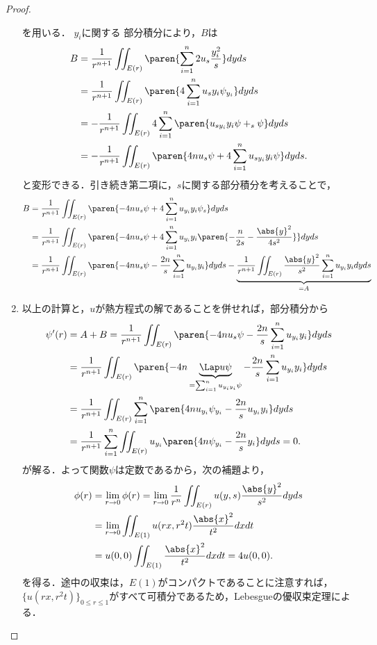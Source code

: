 \documentclass[uplatex,dvipdfmx]{jsarticle}
\begin{document}
\begin{proof}
\begin{enumerate}[{Step}1]
        を用いる．
        $y_i$に関する
        部分積分により，$B$は
        \begin{align*}
            B&=\frac{1}{r^{n+1}}\iint_{E(r)}\paren{\sum_{i=1}^n2u_s\frac{y_i^2}{s}}dyds\\
            &=\frac{1}{r^{n+1}}\iint_{E(r)}\paren{4\sum_{i=1}^nu_sy_i\psi_{y_i}}dyds\\
            &=-\frac{1}{r^{n+1}}\iint_{E(r)}4\sum_{i=1}^n\paren{u_{sy_i}y_i\psi+_s\psi}dyds\\
            &=-\frac{1}{r^{n+1}}\iint_{E(r)}\paren{4nu_s\psi+4\sum_{i=1}^nu_{sy_i}y_i\psi}dyds.
        \end{align*}
        と変形できる．引き続き第二項に，$s$に関する部分積分を考えることで，
        \begin{align*}
            B&=\frac{1}{r^{n+1}}\iint_{E(r)}\paren{-4nu_s\psi+4\sum_{i=1}^nu_{y_i}y_i\psi_s}dyds\\
            &=\frac{1}{r^{n+1}}\iint_{E(r)}\paren{-4nu_s\psi+4\sum_{i=1}^nu_{y_i}y_i\paren{-\frac{n}{2s}-\frac{\abs{y}^2}{4s^2}}}dyds\\
            &=\frac{1}{r^{n+1}}\iint_{E(r)}\paren{-4nu_s\psi-\frac{2n}{s}\sum_{i=1}^nu_{y_i}y_i}dyds-\underbrace{\frac{1}{r^{n+1}}\iint_{E(r)}\frac{\abs{y}^2}{s^2}\sum_{i=1}^nu_{y_i}y_idyds}_{=A}
        \end{align*}
        \item 以上の計算と，$u$が熱方程式の解であることを併せれば，部分積分から
        \begin{align*}
            \psi'(r)&=A+B=\frac{1}{r^{n+1}}\iint_{E(r)}\paren{-4nu_s\psi-\frac{2n}{s}\sum_{i=1}^nu_{y_i}y_i}dyds\\
            &=\frac{1}{r^{n+1}}\iint_{E(r)}\paren{-4n\underbrace{\Lap u\psi}_{=\sum_{i=1}^nu_{y_iy_i}\psi}-\frac{2n}{s}\sum_{i=1}^nu_{y_i}y_i}dyds\\
            &=\frac{1}{r^{n+1}}\iint_{E(r)}\sum_{i=1}^n\paren{4nu_{y_i}\psi_{y_i}-\frac{2n}{s}u_{y_i}y_i}dyds\\
            &=\frac{1}{r^{n+1}}\sum_{i=1}^n\iint_{E(r)}u_{y_i}\paren{4n\psi_{y_i}-\frac{2n}{s}y_i}dyds=0.
        \end{align*}
        が解る．よって関数$\psi$は定数であるから，次の補題より，
        \begin{align*}
            \phi(r)&=\lim_{r\to0}\phi(r)=\lim_{r\to0}\frac{1}{r^n}\iint_{E(r)}u(y,s)\frac{\abs{y}^2}{s^2}dyds\\
            &=\lim_{r\to0}\iint_{E(1)}u(rx,r^2t)\frac{\abs{x}^2}{t^2}dxdt\\
            &=u(0,0)\iint_{E(1)}\frac{\abs{x}^2}{t^2}dxdt=4u(0,0).
        \end{align*}
        を得る．途中の収束は，$E(1)$がコンパクトであることに注意すれば，
        $\{u(rx,r^2t)\}_{0\le r\le 1}$がすべて可積分であるため，Lebesgueの優収束定理による．
    \end{enumerate}
\end{proof}
\end{document}
